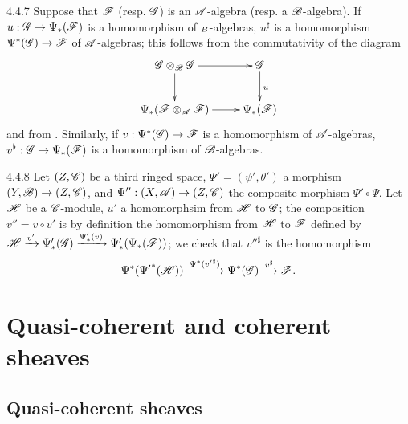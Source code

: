 \begin{env}{4.4.7}
\label{env-0.4.4.7}
Suppose that $\mathscr{F}$ (resp. $\mathscr{G}$) is an $\mathscr{A}$-algebra (resp. a $\mathscr{B}$-algebra). If
$u:\mathscr{G}\to\Psi_*(\mathscr{F})$ is a homomorphism of $\sb{B}$-algebras, $u^\sharp$ is a
homomorphism $\Psi^*(\mathscr{G})\to\mathscr{F}$ of $\mathscr{A}$-algebras; this follows from the
commutativity of the diagram
\[
  \xymatrix{
    \sh{G}\otimes_\sh{B}\sh{G}\ar[r]\ar[d] &
    \sh{G}\ar[d]^u\\
    \Psi_*(\sh{F}\otimes_\sh{A}\sh{F})\ar[r] &
    \Psi_*(\sh{F})
  }
\]
and from . Similarly, if $v:\Psi^*(\mathscr{G})\to\mathscr{F}$ is a homomorphism of
$\mathscr{A}$-algebras, $v^\flat:\mathscr{G}\to\Psi_*(\mathscr{F})$ is a homomorphism of $\mathscr{B}$-algebras.
\end{env}

\begin{env}{4.4.8}
\label{env-0.4.4.8}
Let $(Z,\mathscr{C})$ be a third ringed space, $\Psi'=(\psi',\theta')$ a morphism
$(Y,\mathscr{B})\to(Z,\mathscr{C})$, and $\Psi'':(X,\mathscr{A})\to(Z,\mathscr{C})$ the composite morphism
$\Psi'\circ\Psi$. Let $\mathscr{H}$ be a $\mathscr{C}$-module, $u'$ a homomorphsim from $\mathscr{H}$ to
$\mathscr{G}$; the composition $v''=v\circ v'$ is by definition the homomorphism from $\mathscr{H}$ to
$\mathscr{F}$ defined by
$\mathscr{H}\xrightarrow{v'}\Psi_*'(\mathscr{G})\xrightarrow{\Psi_*'(v)}\Psi_*'(\Psi_*(\mathscr{F}))$; we
check that ${v''}^\sharp$ is the homomorphism
\[
  \Psi^*({\Psi'}^*(\mathscr{H}))\xrightarrow{\Psi^*({v'}^\sharp)}\Psi^*(\mathscr{G})
  \xrightarrow{v^\sharp}\mathscr{F}.
\]
\end{env}

\section{Quasi-coherent and coherent sheaves}
\label{0-prelim-5}

\subsection{Quasi-coherent sheaves}
\label{0-prelim-5.1}

